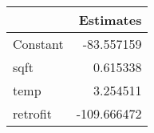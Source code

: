 \begin{tabular}{lr}
\toprule
{} &   Estimates \\
\midrule
Constant &  -83.557159 \\
sqft     &    0.615338 \\
temp     &    3.254511 \\
retrofit & -109.666472 \\
\bottomrule
\end{tabular}
